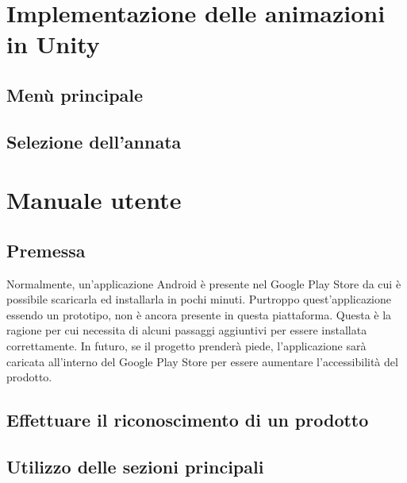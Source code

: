 \section{Implementazione delle animazioni in Unity}
\subsection{Menù principale}
\subsection{Selezione dell'annata}

\section{Manuale utente}
\subsection{Premessa}

Normalmente, un'applicazione Android è presente nel Google Play Store da cui è possibile scaricarla ed installarla in pochi minuti. Purtroppo quest'applicazione essendo un prototipo, non è ancora presente in questa piattaforma. Questa è la ragione per cui necessita di alcuni passaggi aggiuntivi per essere installata correttamente. In futuro, se il progetto prenderà piede, l'applicazione sarà caricata all'interno del Google Play Store per essere aumentare l'accessibilità del prodotto.

\subsection{Effettuare il riconoscimento di un prodotto}
\subsection{Utilizzo delle sezioni principali}